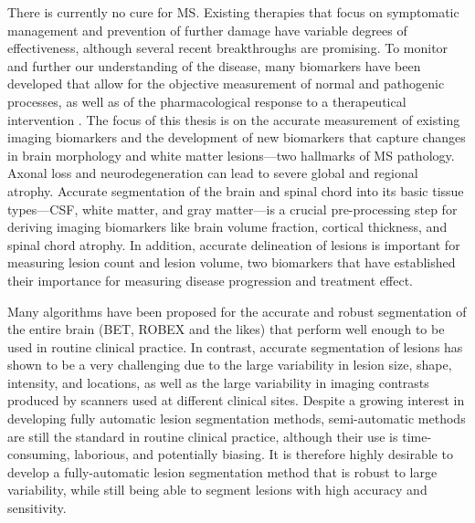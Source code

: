 There is currently no cure for MS. Existing therapies that focus on symptomatic
management and prevention of further damage have variable degrees of
effectiveness, although several recent breakthroughs are promising. To monitor
and further our understanding of the disease, many biomarkers have been
developed that allow for the objective measurement of normal and pathogenic
processes, as well as of the pharmacological response to a therapeutical
intervention \citep{katsavos2013}. The focus of this thesis is on the accurate
measurement of existing imaging biomarkers and the development of new biomarkers
that capture changes in brain morphology and white matter lesions---two
hallmarks of MS pathology. Axonal loss and neurodegeneration can lead to severe
global and regional atrophy. Accurate segmentation of the brain and spinal chord
into its basic tissue types---CSF, white matter, and gray matter---is a crucial
pre-processing step for deriving imaging biomarkers like brain volume fraction,
cortical thickness, and spinal chord atrophy. In addition, accurate delineation
of lesions is important for measuring lesion count and lesion volume, two
biomarkers that have established their importance for measuring disease
progression and treatment effect.

Many algorithms have been proposed for the accurate and robust segmentation of
the entire brain (BET, ROBEX and the likes) that perform well enough to be used
in routine clinical practice. In contrast, accurate segmentation of lesions has
shown to be a very challenging due to the large variability in lesion size,
shape, intensity, and locations, as well as the large variability in imaging
contrasts produced by scanners used at different clinical sites. Despite a
growing interest in developing fully automatic lesion segmentation methods,
semi-automatic methods are still the standard in routine clinical practice,
although their use is time-consuming, laborious, and potentially biasing. It is
therefore highly desirable to develop a fully-automatic lesion segmentation
method that is robust to large variability, while still being able to segment
lesions with high accuracy and sensitivity.

%


